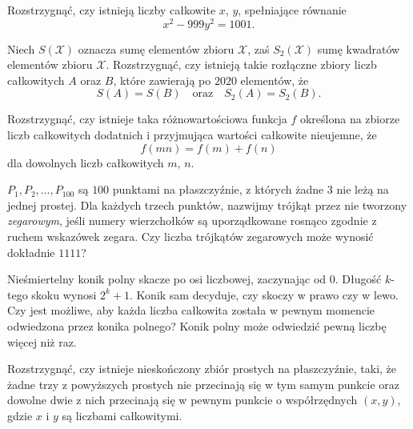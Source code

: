 
\begin{problem}{1}
	Rozstrzygnąć, czy istnieją liczby całkowite $x$, $y$, spełniające równanie
	\[
		x^2 - 999y^2 = 1001.
	\]
\end{problem}

\begin{problem}{2}
	Niech $S(\mathcal{X})$ oznacza sumę elementów zbioru $\mathcal{X}$, zaś $S_2(\mathcal{X})$ sumę kwadratów elementów zbioru $\mathcal{X}$. Rozstrzygnąć, czy istnieją takie rozłączne zbiory liczb całkowitych $A$ oraz $B$, które zawierają po $2020$ elementów, że
	\[
		S(A) = S(B) \quad \text{oraz} \quad S_2(A) = S_2(B).
	\]
\end{problem}


\begin{problem}{3}
	Rozstrzygnąć, czy istnieje taka różnowartościowa funkcja $f$ określona na zbiorze liczb całkowitych dodatnich i przyjmująca wartości całkowite nieujemne, że
	\[
		f(mn) = f(m) + f(n)
	\]
	dla dowolnych liczb całkowitych $m$, $n$.
\end{problem}


\begin{problem}{4}
	$P_1,P_2,\ldots,P_{100}$ są $100$ punktami na płaszczyźnie, z których żadne 3 nie leżą na jednej prostej. Dla każdych trzech punktów, nazwijmy trójkąt przez nie tworzony \textit{zegarowym}, jeśli numery wierzchołków są uporządkowane rosnąco zgodnie z ruchem wskazówek zegara. Czy liczba trójkątów zegarowych może wynosić dokładnie $1111$?
\end{problem}

\begin{problem}{5}
	Nieśmiertelny konik polny skacze po osi liczbowej, zaczynając od $0$. Długość $k$-tego skoku wynosi $2^k + 1$. Konik sam decyduje, czy skoczy w prawo czy w lewo. Czy jest możliwe, aby każda liczba całkowita została w pewnym momencie odwiedzona przez konika polnego? Konik polny może odwiedzić pewną liczbę więcej niż raz.
\end{problem}

\begin{problem}{6}
	Rozstrzygnąć, czy istnieje nieskończony zbiór prostych na płaszczyźnie, taki, że żadne trzy z powyższych prostych nie przecinają się w tym samym punkcie oraz dowolne dwie z nich przecinają się w pewnym punkcie o współrzędnych $(x, y)$, gdzie $x$ i $y$ są liczbami całkowitymi.
\end{problem}


